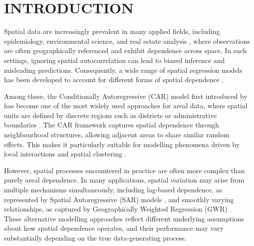 \documentclass[a4paper,reqno]{amsart}
\begin{document}
\vspace{1.5cc}
\section{INTRODUCTION} %


Spatial data are increasingly prevalent in many applied fields,
including epidemiology, environmental science, and real estate
analysis \cite{cressie2015statistics}, where observations are often geographically referenced and
exhibit dependence across space. In such settings, ignoring spatial
autocorrelation can lead to biased inference and misleading
predictions. Consequently, a wide range of spatial regression models
has been developed to account for different forms of spatial
dependence \cite{stewart2018localized, yang2019does, soltani2021housing}.

Among these, the Conditionally Autoregressive (CAR) model first introduced by \cite{besag1974spatial}
has become one of the most widely used approaches for areal data, where spatial units
are defined by discrete regions such as districts or administrative
boundaries \cite{lee2011comparison, lee2013carbayes, byrne2020bayesian, banerjee2014hierarchical}.
The CAR framework captures spatial dependence through
neighbourhood structures, allowing adjacent areas to share similar
random effects. This makes it particularly suitable for modelling
phenomena driven by local interactions and spatial clustering \cite{browning2020simple, Lawson2015A}.

However, spatial processes encountered in practice are often more
complex than purely areal dependence. In many applications, spatial
variation may arise from multiple mechanisms simultaneously, including
lag-based dependence, as represented by Spatial Autoregressive (SAR)
models \cite{golgher2016interpret, LeSage2014}, and smoothly varying relationships, as captured by
Geographically Weighted Regression (GWR) \cite{brunsdon1996geographically, fotheringham2003geographically, lu2014spatially, harris2010regression}. 
These alternative modelling
approaches reflect different underlying assumptions about how spatial
dependence operates, and their performance may vary substantially
depending on the true data-generating process.
\end{document}
